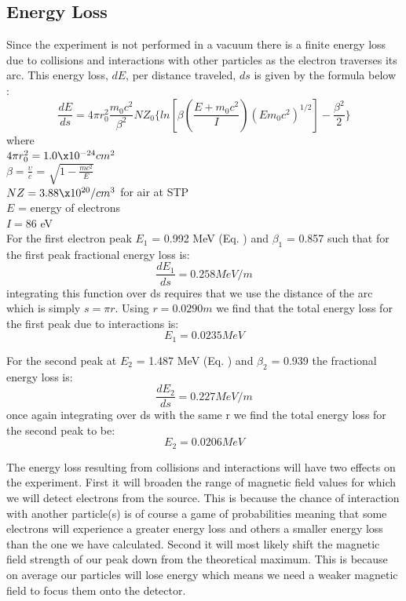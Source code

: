 \subsection {Energy Loss}
Since the experiment is not performed in a vacuum there is a finite energy loss due to collisions and interactions with other particles as the electron traverses its arc.  This energy loss, $dE$, per distance traveled, $ds$ is given by the formula below \cite{bethe}:
\begin{equation}
\frac{dE}{ds} = 4\pi r^{2}_{0} \frac{m_{0}c^{2}}{\beta^{2}} N Z_{0} \{ ln[\beta (\frac{E+m_{0}c^{2}}{I})({E}{m_{0}c^{2}})^{1/2} ] - \frac{\beta^{2}}{2} \} 
\end{equation} 
where\\
$4\pi r_{0}^{2} = 1.0 \x 10^{-24} cm^{2}$\\
$\beta = \frac{\upsilon}{c}$ = $\sqrt{1-\frac{mc^{2}}{E}}$\\
$NZ = 3.88 \x 10^{20} / cm^{3}$ for air at STP\\
$E$ = energy of electrons\\
$I = 86$ eV\\

For the first electron peak $E_1$ = 0.992 MeV (Eq. ) and $\beta_1$ = 0.857 such that for the first peak fractional  energy loss is:
\begin{equation}
\frac{dE_1}{ds} = 0.258 MeV/m
\end{equation}
integrating this function over ds requires that we use the distance of the arc which is simply $s=\pi r$. Using $r = 0.0290 m$ we find that the total energy loss for the first peak due to interactions is:
\begin{equation}
E_1 = 0.0235 MeV
\end{equation} 

For the second peak at $E_2$ = 1.487 MeV (Eq. ) and $\beta_2$ = 0.939 the fractional energy loss is:
\begin{equation}
\frac{dE_2}{ds} = 0.227 MeV/m
\end{equation}
once again integrating over ds with the same r we find the total energy loss for the second peak to be:
\begin{equation}
E_2 = 0.0206 MeV
\end{equation}

The energy loss resulting from collisions and interactions will have two effects on the experiment.  First it will broaden the range of magnetic field values for which we will detect electrons from the source. This is because the chance of interaction with another particle(s) is of course a game of probabilities meaning that some electrons will experience a greater energy loss and others a smaller energy loss than the one we have calculated.  Second it will most likely shift the magnetic field strength of our peak down from the theoretical maximum.  This is because on average our particles will lose energy which means we need a weaker magnetic field to focus them onto the detector.  
  


